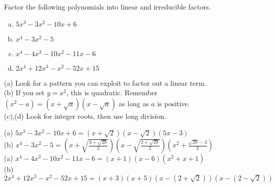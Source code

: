 \begin{question} Factor the following polynomials into linear and irreducible factors.
\begin{enumerate}[(a)]
\item $5x^3-3x^2-10x+6$
\item $x^4-3x^2-5$
\item $x^4-4x^3-10x^2-11x-6$
\item $2x^4+12x^3-x^2-52x+15$
\end{enumerate}
\end{question}
\begin{hint}
(a) Look for a pattern you can exploit to factor out a linear term.\\
(b) If you set $y=x^2$, this is quadratic. Remember $(x^2-a)= (x+\sqrt{a})(x-\sqrt{a})$ as long as $a$ is positive.\\
(c),(d) Look for integer roots, then use long division.
\end{hint}
\begin{answer}
(a) $5x^3-3x^2-10x+6=(x+\sqrt{2})(x-\sqrt{2})(5x-3)$\\[10pt]
(b)  $x^4-3x^2-5=\displaystyle\left(x+\sqrt{\frac{3+\sqrt{29}}{2}}\right)\left(x-\sqrt{\frac{3+\sqrt{29}}{2}}\right)\left(x^2+\frac{\sqrt{29}-3}{2}\right)$\\[10pt]
(a) $x^4-4x^3-10x^2-11x-6 = (x+1)(x-6)(x^2+x+1)$\\
(b) $2x^4+12x^3-x^2-52x+15= (x+3)(x+5)\left(x-(2+\sqrt2)\right)\left(x-(2-\sqrt2)\right)$
\end{answer}
